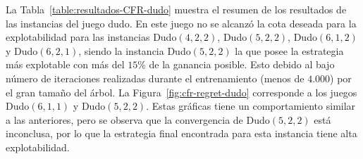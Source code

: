 La Tabla~\ref{table:resultados-CFR-dudo} muestra el resumen de los resultados de las instancias del juego dudo. En este juego no se alcanzó la cota deseada para la explotabilidad para las instancias Dudo$(4, 2, 2)$, Dudo$(5, 2, 2)$, Dudo$(6, 1, 2)$ y Dudo$(6, 2, 1)$, siendo la instancia Dudo$(5, 2, 2)$ la que posee la estrategia más explotable con más del $15\%$ de la ganancia posible. Esto debido al bajo número de iteraciones realizadas durante el entrenamiento (menos de $4.000$) por el gran tamaño del árbol. La Figura~\ref{fig:cfr-regret-dudo} corresponde a los juegos Dudo$(6, 1, 1)$ y Dudo$(5, 2, 2)$. Estas gráficas tiene un comportamiento similar a las anteriores, pero se observa que la convergencia de Dudo$(5, 2, 2)$ está inconclusa, por lo que la estrategia final encontrada para esta instancia tiene alta explotabilidad.

